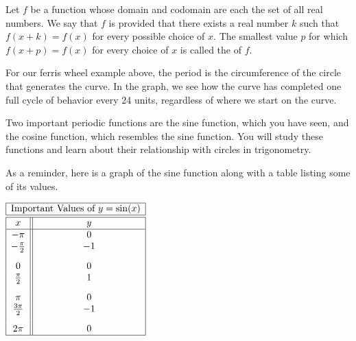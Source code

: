\documentclass[nooutcomes]{ximera}
\begin{document}
\begin{definition}
Let $f$ be a function whose domain and codomain %
are each the set of all real numbers. We say that $f$ is  provided that there exists a real number $k$ such that $f(x + k) = f(x)$ for every possible choice of $x$. The smallest value $p$ for which $f(x + p) = f(x)$ for every choice of $x$ is called the  of $f$.

\end{definition}

For our ferris wheel example above, the period is the circumference of the circle that generates the curve. In the graph, we see how the curve has completed one full cycle of behavior every 24 units, regardless of where we start on the curve.

Two important periodic functions are the sine function, which you have seen, and the cosine function, which resembles the sine function. You will study these functions and learn about their relationship with circles in trigonometry.

As a reminder, here is a graph of the sine function along with a table listing some of its values.

\begin{image}
\end{image}

\begin{center}
\(
\begin{array}{ |c || c|  }
 \hline
 \multicolumn{2}{|c|}{\text{\normalfont Important Values of } y=\sin(x)} \\
\hline
 \hline
 x & y\\
 \hline

 -\pi&0\\

 -\frac{\pi}{2}&-1\\[2ex]

 0&0\\

 \frac{\pi}{2}&1\\[2ex]

 \pi&0\\

\frac{3\pi}{2}&-1\\[2ex]

 2 \pi&0\\
\hline
\end{array}
\)
\end{center} 
\end{document}
